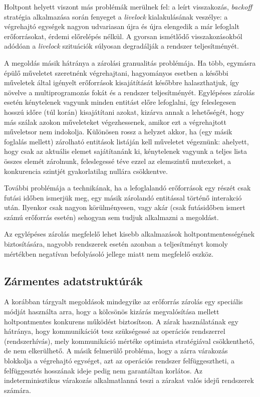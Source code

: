     Holtpont helyett viszont más problémák merülnek fel: a leírt visszakozás, \emph{backoff} stratégia alkalmazása során fenyeget a \emph{livelock} kialakulásának veszélye: a végrehajtó egységek nagyon udvariasan újra és újra elengedik a már lefoglalt erőforrásokat, érdemi előrelépés nélkül. A gyorsan ismétlődő visszakozásokból adódóan a \emph{livelock} szituációk súlyosan degradálják a rendszer teljesítményét.
    
    A megoldás másik hátránya a zárolási granualitás problémája. Ha több, egymásra épülő műveletet szeretnénk végrehajtani, hagyományos esetben a későbbi műveletek által igényelt erőforrások kisajátítását későbbre halaszthatjuk, így növelve a multiprogramozás fokát és a rendszer teljesítményét. Egylépéses zárolás esetén kénytelenek vagyunk minden entitást előre lefoglalni, így feleslegesen hosszú időre (túl korán) kisajátítani azokat, kizárva annak a lehetőségét, hogy más szálak azokon műveleteket végezhessenek, amikor ezt a végrehajtott műveletsor nem indokolja. Különösen rossz a helyzet akkor, ha (egy másik foglalás mellett) zárolható entitások listáján kell műveletet végeznünk: ahelyett, hogy csak az aktuális elemet sajátítanánk ki, kénytelenek vagyunk a teljes lista összes elemét zárolnunk, feleslegessé téve ezzel az elemszintű mutexeket, a konkurencia szintjét gyakorlatilag nullára csökkentve.
    
    További problémája a technikának, ha a lefoglalandó erőforrások egy részét csak futási időben ismerjük meg, egy másik zárolandó entitással történő interakció után. Ilyenkor csak nagyon körülményesen, vagy akár (csak futásidőben ismert számú erőforrás esetén) sehogyan sem tudjuk alkalmazni a megoldást.
    
    Az egylépéses zárolás megfelelő lehet kisebb alkalmazások holtpontmentességének biztosítására, nagyobb rendszerek esetén azonban a teljesítményt komoly mértékben negatívan befolyásoló jellege miatt nem megfelelő eszköz.
    
    \subsection{Zármentes adatstruktúrák}
    \label{seq:lockfree}
     
    A korábban tárgyalt megoldások mindegyike az erőforrás zárolás egy speciális módját használta arra, hogy a kölcsönös kizárás megvalósítása mellett holtpontmentes konkurens működést biztosítson. A zárak használatának egy hátránya, hogy kommunikációt tesz szükségessé az operációs rendszerrel (rendszerhívás), mely kommunikáció mértéke optimista stratégiával csökkenthető, de nem elkerülhető. A másik felmerülő probléma, hogy a zárra várakozás blokkolja a végrehajtó egységet, azt az operációs rendszer felfüggesztheti, a felfüggesztés hosszának ideje pedig nem garantáltan korlátos. Az indeterminisztikus várakozás alkalmatlanná teszi a zárakat valós idejű rendszerek számára.
    
